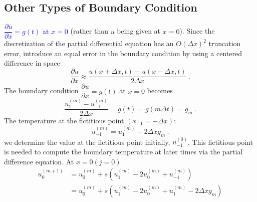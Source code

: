 \documentclass[12pt,a4paper]{article}
\begin{document}
\subsection{Other Types of Boundary Condition}
\textcolor{blue}{$\dfrac{\partial u}{\partial x}=g(t)$ at $x=0$} (rather than $u$ being given at $x=0$). Since the discretization of the partial differential equation has an $O(\Delta x)^2$ truncation error, introduce an equal error in the boundary condition by using a centered difference in space
\begin{equation}
\dfrac{\partial u}{\partial x}  \approx \frac{u(x+\Delta x, t) -u(x-\Delta x, t)}{2\Delta x} ~.
\end{equation}
The boundary condition $\dfrac{\partial u}{\partial x}=g(t)$ at $x=0$ becomes
\begin{equation}
\frac{u_1^{(m)} -u_{-1}^{(m)} }{2\Delta x} = g(t) = g(m\Delta t) = g_m ~.
\end{equation}
The temperature at the fictitious point $(x_{-1} =-\Delta x)$:
\begin{equation}
u_{-1}^{(m)} = u_{1}^{(m)} -2\Delta x g_m~.
\end{equation}
we determine the value at the fictitious point initially, $u_{-1}^{(0)}$. This fictitious point is needed to compute the boundary temperature at later times via the partial difference equation. At $x=0 (j=0)$
\begin{align*}
u_{0}^{(m+1)} &= u_{0}^{(m)} +s\left(u_{1}^{(m)} -2u_{0}^{(m)} +u_{-1}^{(m)}\right) \\
&= u_{0}^{(m)} +s\left(u_{1}^{(m)} -2u_{0}^{(m)} +u_{1}^{(m)} -2\Delta x g_m\right)
\end{align*}
\end{document}
